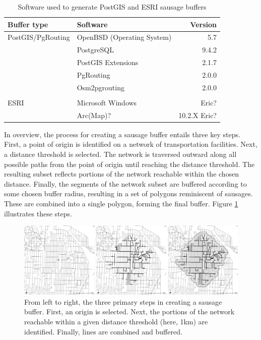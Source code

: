 \documentclass[11pt,letterpaper]{article} %
\begin{document}
\begin{table}[h!]
  \centering
  \caption{Software used to generate PostGIS and ESRI sausage buffers}
  \begin{tabular}{llr}
  \toprule
  Buffer type & Software & Version \\
  \midrule
PostGIS/PgRouting & OpenBSD (Operating System) & 5.7 \\
              & PostgreSQL & 9.4.2 \\
              & PostGIS Extensions & 2.1.7 \\
              & PgRouting & 2.0.0 \\
              & Osm2pgrouting & 2.0.0 \\
              &  &  \\
  ESRI & Microsoft Windows & Eric? \\
              & Arc(Map)? & 10.2.X Eric? \\
  \bottomrule
\end{tabular}
\label{tab:software}
\end{table}

In overview, the process for creating a sausage buffer entails three
key steps. First, a point of origin is identified on a network of
transportation facilities. Next, a distance threshold is selected. The
network is traversed outward along all possible paths from the point
of origin until reaching the distance threshold. The resulting subset
reflects portions of the network reachable within the chosen
distance. Finally, the segments of the network subset are buffered
according to some chosen buffer radius, resulting in a set of polygons
reminiscent of sausages. These are combined into a single polygon,
forming the final buffer. Figure \ref{fig:sausage-steps} illustrates
these steps.

\begin{figure}[h!]
  \centering
  \includegraphics[width=\textwidth]{./figs/sausage-steps}
  \caption{From left to right, the three primary steps in creating a
    sausage buffer. First, an origin is selected. Next, the portions
    of the network reachable within a given distance threshold (here,
    1km) are identified. Finally, lines are combined and buffered.}
  \label{fig:sausage-steps}
\end{figure}
\end{document}
